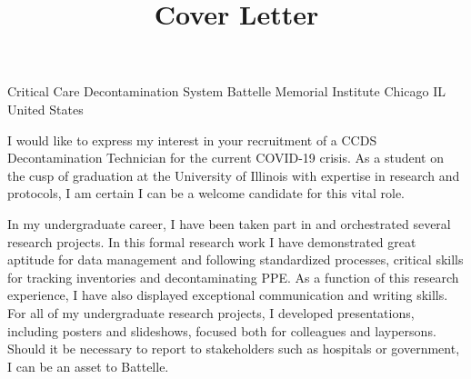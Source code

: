 \title{Cover Letter}

\maketitle

\toaddress
    {Critical Care Decontamination System}
    {Battelle Memorial Institute}
    {}
    {Chicago}
    {IL}
    {}
    {United States}

I would like to express my interest in your recruitment of a
CCDS Decontamination Technician for the current COVID-19 crisis.
As a student on the cusp of graduation at the University of
Illinois with expertise in research and protocols, I am
certain I can be a welcome candidate for this vital role.

In my undergraduate career, I have been taken part in and orchestrated
several research projects. In this formal research work I have demonstrated
great aptitude for data management and following standardized processes,
critical skills for tracking inventories and decontaminating PPE.
As a function of this research experience, I have also displayed exceptional
communication and writing skills. For all of my undergraduate research projects,
I developed presentations, including posters and slideshows, focused both for
colleagues and laypersons. Should it be necessary to report to stakeholders
such as hospitals or government, I can be an asset to Battelle.


